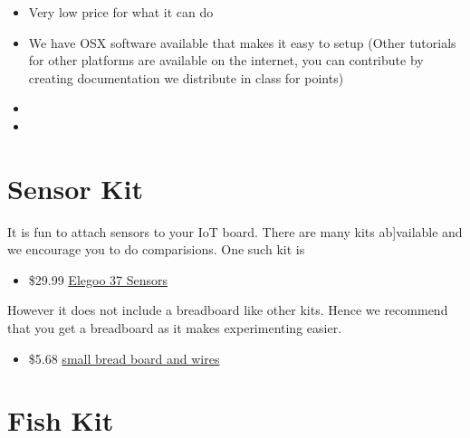 \begin{itemize}
\item
  Very low price for what it can do
\item
  We have OSX software available that makes it easy to setup (Other
  tutorials for other platforms are available on the internet, you can
  contribute by creating documentation we distribute in class for
  points)
\item
\item
\end{itemize}

\section{Sensor Kit}\label{sensor-kit}

It is fun to attach sensors to your IoT board. There are many kits
ab{]}vailable and we encourage you to do comparisions. One such kit is

\begin{itemize}

\item
  \$29.99
  \href{https://www.amazon.com/Elegoo-Upgraded-Modules-Tutorial-Arduino/dp/B01MG49ZQ5/ref=sr_1_7?s=electronics\&ie=UTF8\&qid=1499251441\&sr=1-7\&keywords=elegoo}{Elegoo
  37 Sensors}
\end{itemize}

However it does not include a breadboard like other kits. Hence we
recommend that you get a breadboard as it makes experimenting easier.

\begin{itemize}

\item
  \$5.68
  \href{https://www.amazon.com/Elegoo-Premium-Female-tie-points-breadboard/dp/B06XB8TZVC/ref=sr_1_23?s=electronics\&ie=UTF8\&qid=1499251600\&sr=1-23\&keywords=elegoo}{small
  bread board and wires}
\end{itemize}

\section{Fish Kit}\label{fish-kit}


